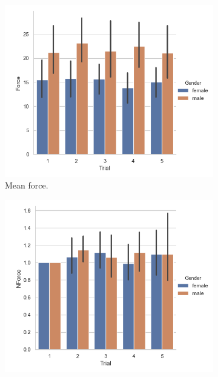 \begin{figure}[H]
     
     \hspace{-10mm}
     \begin{subfigure}[b]{0.3\textwidth}
\centering
     \includegraphics[scale=0.4]{Files/Plots/force_mean_by_trial_gen.png}
         \caption{Mean force.}
     \label{fig:forceMeanTrialGen}
     \end{subfigure}
    \hspace{7mm}
     \begin{subfigure}[b]{0.3\textwidth}
         \centering
     \includegraphics[scale=0.4]{Files/Plots/forceNforce_mean_by_trial_gen.png}

\end{subfigure}
\end{figure}
